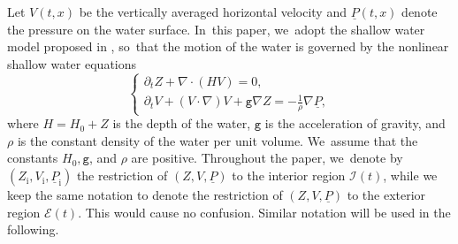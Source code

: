 \documentclass[JEP,XML,SOM,Unicode,NoFloatCountersInSection,published]{cedram}
\newcommand{\gr}{{\mathtt g}}
\newcommand{\dt}{\partial_t}
\newcommand{\cI}{{\mathcal I}}
\newcommand{\cE}{{\mathcal E}}
\newcommand{\ul}[1]{\underline{#1}}
\theoremstyle{definition}
\begin{document}
Let $V(t,x)$ be the vertically averaged horizontal velocity and $\ul{P}(t,x)$ denote the pressure on the water surface. In~this paper, we~adopt the shallow water model proposed in \cite{Lannes2017}, so~that the motion of the water is governed by the nonlinear shallow water equations
\begin{equation}\label{NLSWE}
\begin{cases}
\dt Z+\nabla\cdot(HV) = 0, \\
\dt V+(V\cdot\nabla)V+\gr\nabla Z = -\frac{1}{\rho}\nabla\ul{P},
\end{cases}
\end{equation}
where $H=H_0+Z$ is the depth of the water, $\gr$ is the acceleration of gravity, and $\rho$ is the constant density of the water per unit volume. We~assume that the constants $H_0, \gr$, and $\rho$ are positive.
Throughout the paper, we~denote by $(Z_\mathrm{i},V_\mathrm{i},\ul{P}_\mathrm{i})$ the restriction of $(Z,V,\ul{P})$ to the interior region $\cI(t)$,
while we keep the same notation to denote the restriction of $(Z,V,\ul{P})$ to the exterior region $\cE(t)$.
This would cause no confusion.
Similar notation will be used in the following.
\end{document}
